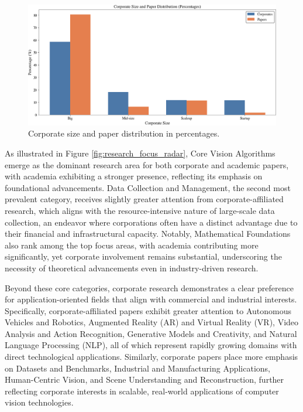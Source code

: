 \documentclass{article}
\begin{document}
\begin{figure}[ht]
  \centering
  \includegraphics[width=\textwidth]{report/images/corporate_paper_distribution.png}  
  \caption{Corporate size and paper distribution in percentages.}
  \label{fig:corporate_size_graph}
\end{figure}

As illustrated in Figure \ref{fig:research_focus_radar}, Core Vision Algorithms emerge as the dominant research area for both corporate and academic papers, with academia exhibiting a stronger presence, reflecting its emphasis on foundational advancements. Data Collection and Management, the second most prevalent category, receives slightly greater attention from corporate-affiliated research, which aligns with the resource-intensive nature of large-scale data collection, an endeavor where corporations often have a distinct advantage due to their financial and infrastructural capacity. Notably, Mathematical Foundations also rank among the top focus areas, with academia contributing more significantly, yet corporate involvement remains substantial, underscoring the necessity of theoretical advancements even in industry-driven research.

Beyond these core categories, corporate research demonstrates a clear preference for application-oriented fields that align with commercial and industrial interests. Specifically, corporate-affiliated papers exhibit greater attention to Autonomous Vehicles and Robotics, Augmented Reality (AR) and Virtual Reality (VR), Video Analysis and Action Recognition, Generative Models and Creativity, and Natural Language Processing (NLP), all of which represent rapidly growing domains with direct technological applications. Similarly, corporate papers place more emphasis on Datasets and Benchmarks, Industrial and Manufacturing Applications, Human-Centric Vision, and Scene Understanding and Reconstruction, further reflecting corporate interests in scalable, real-world applications of computer vision technologies.
\end{document}
